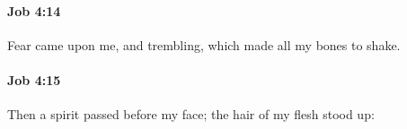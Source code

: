 		\paragraph{Job 4:14} %
			\label{JOB-4-14}

			Fear came upon me, and trembling, which made all my bones to shake.


		\paragraph{Job 4:15} %
			\label{JOB-4-15}

			Then a spirit passed before my face; the hair of my flesh stood up:


